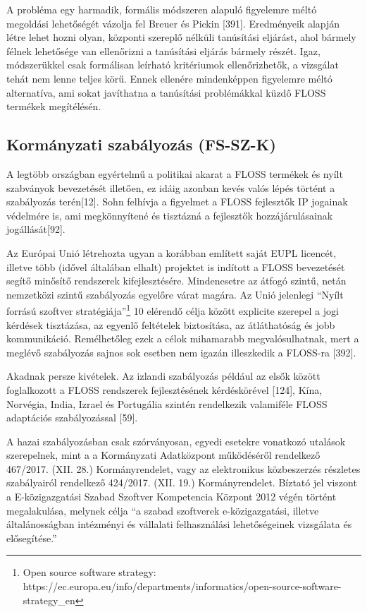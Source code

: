 \documentclass[12pt,magyar,a4paper,oneside]{scrreprt}
\begin{document}
A probléma egy harmadik, formális módszeren alapuló figyelemre méltó
megoldási lehetőségét vázolja fel Breuer és Pickin {[}391{]}.
Eredményeik alapján létre lehet hozni olyan, központi szereplő nélküli
tanúsítási eljárást, ahol bármely félnek lehetősége van ellenőrizni a
tanúsítási eljárás bármely részét. Igaz, módszerükkel csak formálisan
leírható kritériumok ellenőrizhetők, a vizsgálat tehát nem lenne teljes
körű. Ennek ellenére mindenképpen figyelemre méltó alternatíva, ami
sokat javíthatna a tanúsítási problémákkal küzdő FLOSS termékek
megítélésén.

\hypertarget{sec:FS-SZ-K}{%
\subsection{Kormányzati szabályozás (FS-SZ-K)}\label{sec:FS-SZ-K}}

A legtöbb országban egyértelmű a politikai akarat a FLOSS termékek és
nyílt szabványok bevezetését illetően, ez idáig azonban kevés valós
lépés történt a szabályozás terén{[}12{]}. Sohn felhívja a figyelmet a
FLOSS fejlesztők IP jogainak védelmére is, ami megkönnyítené és
tisztázná a fejlesztők hozzájárulásainak jogállását{[}92{]}.

Az Európai Unió létrehozta ugyan a korábban említett saját EUPL
licencét, illetve több (idővel általában elhalt) projektet is indított a
FLOSS bevezetését segítő minősítő rendszerek kifejlesztésére.
Mindenesetre az átfogó szintű, netán nemzetközi szintű szabályozás
egyelőre várat magára. Az Unió jelenlegi ``Nyílt forrású szoftver
stratégiája''\footnote{Open source software strategy:
  https://ec.europa.eu/info/departments/informatics/open-source-software-strategy\_en}
10 elérendő célja között explicite szerepel a jogi kérdések tisztázása,
az egyenlő feltételek biztosítása, az átláthatóság és jobb kommunikáció.
Remélhetőleg ezek a célok mihamarabb megvalósulhatnak, mert a meglévő
szabályozás sajnos sok esetben nem igazán illeszkedik a FLOSS-ra
{[}392{]}.

Akadnak persze kivételek. Az izlandi szabályozás például az elsők között
foglalkozott a FLOSS rendszerek fejlesztésének kérdéskörével {[}124{]},
Kína, Norvégia, India, Izrael és Portugália szintén rendelkezik
valamiféle FLOSS adaptációs szabályozással {[}59{]}.

A hazai szabályozásban csak szórványosan, egyedi esetekre vonatkozó
utalások szerepelnek, mint a a Kormányzati Adatközpont működéséről
rendelkező 467/2017. (XII. 28.) Kormányrendelet, vagy az elektronikus
közbeszerzés részletes szabályairól rendelkező 424/2017. (XII. 19.)
Kormányrendelet. Bíztató jel viszont a E-közigazgatási Szabad Szoftver
Kompetencia Központ 2012 végén történt megalakulása, melynek célja ``a
szabad szoftverek e-közigazgatási, illetve általánosságban intézményi és
vállalati felhasználási lehetőségeinek vizsgálata és elősegítése.''
\end{document}

